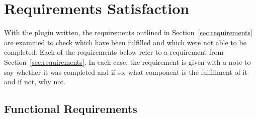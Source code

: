 
\section{Requirements Satisfaction}
\label{sec:requirements_satisfaction}

With the plugin written, the requirements outlined in
Section~\ref{sec:requirements} are examined to check which have been fulfilled
and which were not able to be completed. Each of the requirements below refer
to a requirement from Section~\ref{sec:requirements}. In each case, the
requirement is given with a note to say whether it was completed and if so,
what component is the fulfillment of it and if not, why not.

\subsection{Functional Requirements}
\label{sub:functional_requirements}

